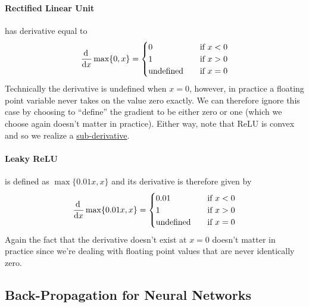 \documentclass[12pt]{article}
\begin{document}
\paragraph{Rectified Linear Unit} has derivative equal to
\begin{align}   \frac{\operatorname{d}\!{\,}}{\operatorname{d}\!{x}} \max\{0,x\}=       \begin{cases}        0 &\quad\text{if } x < 0\\        1 &\quad\text{if } x > 0 \\
       \textrm{undefined} &\quad\text{if } x = 0      \end{cases} \end{align}
Technically the derivative is undefined when $x = 0$, however, in practice a floating point variable never takes on the value zero exactly. We can therefore ignore this case by choosing to ``define'' the gradient to be either zero or one (which we choose again doesn't matter in practice). Either way, note that ReLU is convex and so we realize a \href{https://en.wikipedia.org/wiki/Subderivative}{sub-derivative}.

\paragraph{Leaky ReLU} is defined as $\max \{0.01 x, x \}$ and its derivative is therefore given by
\begin{align}   
  \frac{\operatorname{d}\!{\,}}{\operatorname{d}\!{x}} \max\{0.01x,x\}=       
  \begin{cases}        
    0.01 &\quad\text{if } x < 0\\        
    1    &\quad\text{if } x > 0 \\
    \textrm{undefined} &\quad\text{if } x = 0      
  \end{cases} 
\end{align}
Again the fact that the derivative doesn't exist at $x=0$ doesn't matter in practice since we're dealing with floating point values that are never identically zero.

\subsection{Back-Propagation for Neural Networks}
\end{document}
